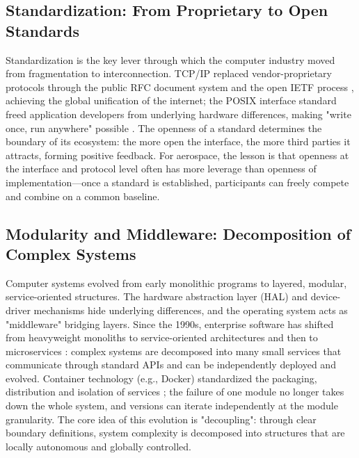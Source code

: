 \documentclass[11pt]{article}
\begin{document}
\subsection{Standardization: From Proprietary to Open Standards}
Standardization is the key lever through which the computer industry moved from fragmentation to interconnection. TCP/IP replaced vendor-proprietary protocols through the public RFC document system and the open IETF process \cite{rfc2026}, achieving the global unification of the internet; the POSIX interface standard freed application developers from underlying hardware differences, making "write once, run anywhere" possible \cite{posix2017}. The openness of a standard determines the boundary of its ecosystem: the more open the interface, the more third parties it attracts, forming positive feedback. For aerospace, the lesson is that openness at the interface and protocol level often has more leverage than openness of implementation---once a standard is established, participants can freely compete and combine on a common baseline.

\subsection{Modularity and Middleware: Decomposition of Complex Systems}
Computer systems evolved from early monolithic programs to layered, modular, service-oriented structures. The hardware abstraction layer (HAL) and device-driver mechanisms hide underlying differences, and the operating system acts as "middleware" bridging layers. Since the 1990s, enterprise software has shifted from heavyweight monoliths to service-oriented architectures and then to microservices \cite{newman2015}: complex systems are decomposed into many small services that communicate through standard APIs and can be independently deployed and evolved. Container technology (e.g., Docker) standardized the packaging, distribution and isolation of services \cite{docker2014}; the failure of one module no longer takes down the whole system, and versions can iterate independently at the module granularity. The core idea of this evolution is "decoupling": through clear boundary definitions, system complexity is decomposed into structures that are locally autonomous and globally controlled.
\end{document}
